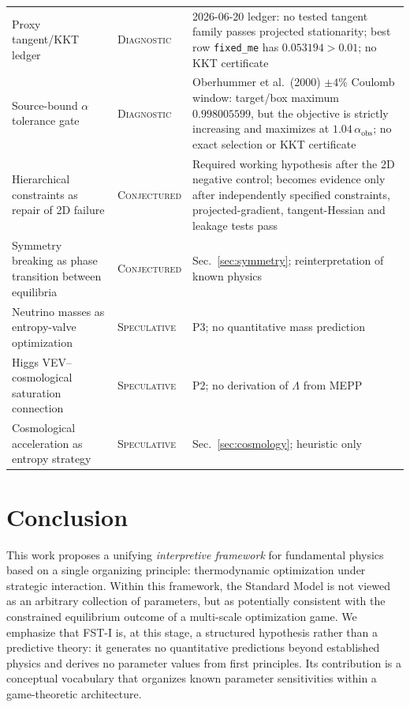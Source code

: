 \documentclass[12pt,a4paper]{article}
\theoremstyle{remark}
\begin{document}
\begin{table}[htbp]
\begin{tabularx}{\textwidth}{@{}>{\raggedright\arraybackslash}p{4.0cm}>{\raggedright\arraybackslash}p{2.7cm}Y@{}}
Proxy tangent/KKT ledger & \textsc{Diagnostic} & 2026-06-20 ledger: no tested tangent family passes projected stationarity; best row \texttt{fixed\_me} has $0.053194>0.01$; no KKT certificate \\
Source-bound $\alpha$ tolerance gate & \textsc{Diagnostic} & Oberhummer et al.\ (2000) $\pm4\%$ Coulomb window: target/box maximum $0.998005599$, but the objective is strictly increasing and maximizes at $1.04\,\alpha_{\mathrm{obs}}$; no exact selection or KKT certificate \\
Hierarchical constraints as repair of 2D failure & \textsc{Conjectured} & Required working hypothesis after the 2D negative control; becomes evidence only after independently specified constraints, projected-gradient, tangent-Hessian and leakage tests pass \\
Symmetry breaking as phase transition between equilibria & \textsc{Conjectured} & Sec.~\ref{sec:symmetry}; reinterpretation of known physics \\
Neutrino masses as entropy-valve optimization & \textsc{Speculative} & P3; no quantitative mass prediction \\
Higgs VEV--cosmological saturation connection & \textsc{Speculative} & P2; no derivation of $\Lambda$ from MEPP \\
Cosmological acceleration as entropy strategy & \textsc{Speculative} & Sec.~\ref{sec:cosmology}; heuristic only \\
\bottomrule
\end{tabularx}
\end{table}

\section{Conclusion}
\label{sec:conclusion}

This work proposes a unifying \emph{interpretive framework} for fundamental physics based on a single organizing principle: thermodynamic optimization under strategic interaction. Within this framework, the Standard Model is not viewed as an arbitrary collection of parameters, but as potentially consistent with the constrained equilibrium outcome of a multi-scale optimization game. We emphasize that FST-I is, at this stage, a structured hypothesis rather than a predictive theory: it generates no quantitative predictions beyond established physics and derives no parameter values from first principles. Its contribution is a conceptual vocabulary that organizes known parameter sensitivities within a game-theoretic architecture.
\end{document}
